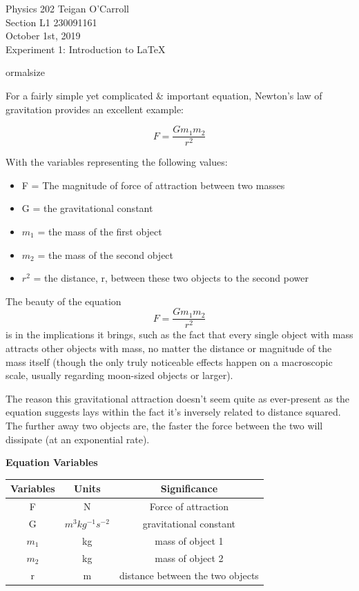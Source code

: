 \documentclass[12pt]{report} %
\begin{document}
Physics 202 \hfill Teigan O'Carroll \\
Section L1 \hfill 230091161 \\
October 1st, 2019 \hfill \\

\vspace{10 mm}
\Large
Experiment 1: Introduction to \LaTeX
\vspace{10 mm}

ormalsize

For a fairly simple yet complicated \& important equation, Newton's law of gravitation provides an excellent example:

\begin{displaymath}
F = \frac{{G}{m_{1}}{m_{2}}}{r^2}
\end{displaymath}

With the variables representing the following values:
\begin{itemize}
    \item F = The magnitude of force of attraction between two masses
    \item G = the gravitational constant
    \item $m_{1}$ = the mass of the first object
    \item $m_{2}$ = the mass of the second object
    \item $r^2$ = the distance, r, between these two objects to the second power
\end{itemize}

\vspace{10 mm}
The beauty of the equation 
\[F = \frac{{G}{m_{1}}{m_{2}}}{r^2}\]%
is in the implications it brings, such as the fact that every single object with mass attracts other objects with mass, no matter the distance or magnitude of the mass itself (though the only truly noticeable effects happen on a macroscopic scale, usually regarding moon-sized objects or larger). 

\vspace{10 mm}
The reason this gravitational attraction doesn't seem quite as ever-present as the equation suggests lays within the fact it's inversely related to distance squared. The further away two objects are, the faster the force between the two will dissipate (at an exponential rate).

\vspace{10 mm}
\begin{center}
{\bf Equation Variables}\\
\vspace{5mm}
\begin{tabular}{| c | c | c |}
\hline
Variables & Units & Significance \\
\hline F
& N
& Force of attraction \\
\hline G
& ${m^3}{kg^{-1}}{s^{-2}}$
& gravitational constant
\\
\hline $m_{1}$
& kg
& mass of object 1\\
\hline $m_{2}$
& kg
& mass of object 2\\
\hline r
& m
& distance between the two objects\\
\hline
\end{tabular}
\end{center}
\end{document}
